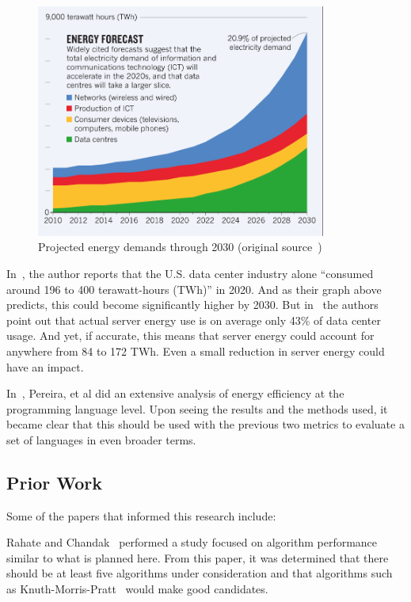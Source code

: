 \begin{figure}[ht]
    \centering
    \includegraphics[width=0.85\textwidth]{figures/data-center-energy.png}
    \caption[Projected energy demands through 2030]{Projected energy demands through 2030 (original source~\cite{garcia2022})}
    \label{fig:image:energy_demands}
\end{figure}

In~\cite{garcia2022}, the author reports that the U.S. data center industry alone ``consumed around 196 to 400 terawatt-hours (TWh)'' in 2020. And as their graph above predicts, this could become significantly higher by 2030. But in~\cite{masanet} the authors point out that actual server energy use is on average only 43\% of data center usage. And yet, if accurate, this means that server energy could account for anywhere from 84 to 172 TWh. Even a small reduction in server energy could have an impact.

In~\cite{pereira}, Pereira, et al did an extensive analysis of energy efficiency at the programming language level. Upon seeing the results and the methods used, it became clear that this should be used with the previous two metrics to evaluate a set of languages in even broader terms.

\subsection{Prior Work}

Some of the papers that informed this research include:

Rahate and Chandak~\cite{rahate} performed a study focused on algorithm performance similar to what is planned here. From this paper, it was determined that there should be at least five algorithms under consideration and that algorithms such as Knuth-Morris-Pratt~\cite{knuth} would make good candidates.

